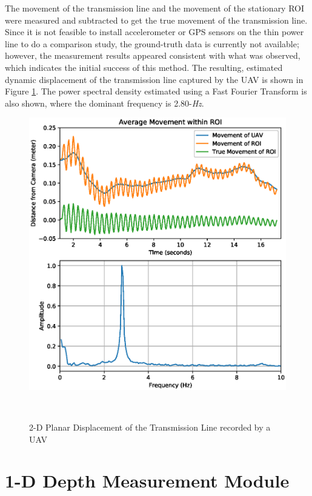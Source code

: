 \documentclass{sigchi}
\begin{document}
The movement of the transmission line and the movement of the stationary ROI were measured and subtracted to get the true movement of the transmission line. Since it is not feasible to install accelerometer or GPS sensors on the thin power line to do a comparison study, the ground-truth data is currently not available; however, the measurement results appeared consistent with what was observed, which indicates the initial success of this method. The resulting, estimated dynamic displacement of the transmission line captured by the UAV is shown in Figure \ref{fig:dis-blast}. The power spectral density estimated using a Fast Fourier Transform is also shown, where the dominant frequency is 2.80-\textit{Hz}.

\begin{figure}[ht]
    \centering
    \includegraphics[width=.9\columnwidth]{Figures/blast_graph}
    \caption{2-D Planar Displacement of the Transmission Line recorded by a UAV}~\label{fig:dis-blast}
\end{figure}

\section{1-D Depth Measurement Module}
\end{document}
